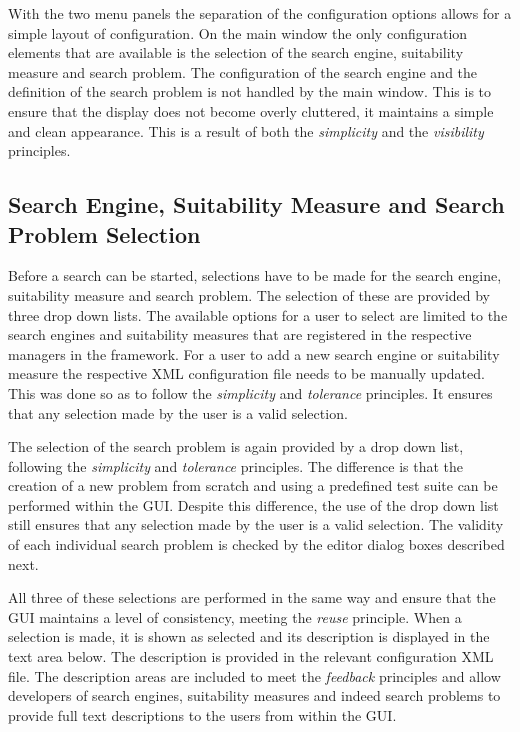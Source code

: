 With the two menu panels the separation of the configuration options allows for a simple layout of configuration.
On the main window the only configuration elements that are available is the selection of the search engine, suitability measure and search problem.
The configuration of the search engine and the definition of the search problem is not handled by the main window.
This is to ensure that the display does not become overly cluttered, it maintains a simple and clean appearance.
This is a result of both the \emph{simplicity} and the \emph{visibility} principles.

\subsection{Search Engine, Suitability Measure and Search Problem Selection}
\label{sec:seselecdes}
\label{sec:smselecdes}
\label{sec:spselecdes}
Before a search can be started, selections have to be made for the search engine, suitability measure and search problem.
The selection of these are provided by three drop down lists.
The available options for a user to select are limited to the search engines and suitability measures that are registered in the respective managers in the framework.
For a user to add a new search engine or suitability measure the respective XML configuration file needs to be manually updated.
This was done so as to follow the \emph{simplicity} and \emph{tolerance} principles.
It ensures that any selection made by the user is a valid selection.

The selection of the search problem is again provided by a drop down list, following the \emph{simplicity} and \emph{tolerance} principles.
The difference is that the creation of a new problem from scratch and using a predefined test suite can be performed within the GUI.
Despite this difference, the use of the drop down list still ensures that any selection made by the user is a valid selection.
The validity of each individual search problem is checked by the editor dialog boxes described next.

All three of these selections are performed in the same way and ensure that the GUI maintains a level of consistency, meeting the \emph{reuse} principle.
When a selection is made, it is shown as selected and its description is displayed in the text area below.
The description is provided in the relevant configuration XML file.
The description areas are included to meet the \emph{feedback} principles and allow developers of search engines, suitability measures and indeed search problems to provide full text descriptions to the users from within the GUI.

